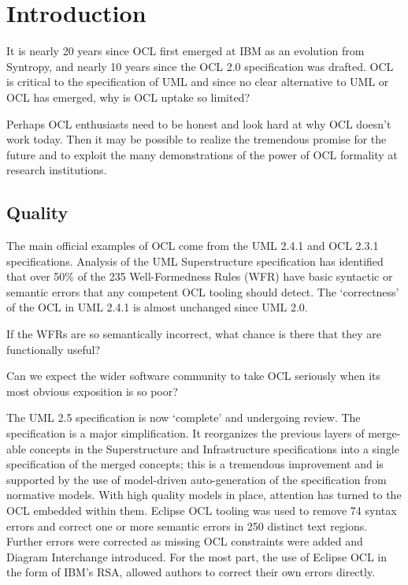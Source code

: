 \documentclass{acm_proc_article-sp}
\begin{document}



\section{Introduction}
It is nearly 20 years since OCL first emerged at IBM as an evolution from Syntropy, and nearly 10 years since the OCL 2.0 specification was drafted\cite{OCL-2.0-draft}. OCL is critical to the specification of UML and since no clear alternative to UML or OCL has emerged, why is OCL uptake so limited?

Perhaps OCL enthusiasts need to be honest and look hard at why OCL doesn't work today.
Then it may be possible to realize the tremendous promise for the future and to exploit the many
demonstrations of the power of OCL formality at research institutions.

\subsection{Quality}

The main official examples of OCL come from the UML 2.4.1\cite{UML-2.4.1-Super} and OCL 2.3.1\cite{OCL-2.3.1} specifications. Analysis\cite{UML-inconsistent} of the UML Superstructure specification has identified that over 50\% of the 235 Well-Formedness Rules (WFR) have basic syntactic or semantic errors
that any competent OCL tooling should detect. The `correctness' of the OCL in UML 2.4.1 is almost unchanged
since UML 2.0.

If the WFRs are so semantically incorrect, what chance is there that they are functionally useful?

Can we expect the wider software community to take OCL seriously when its most obvious exposition is so poor?

The UML 2.5 specification is now `complete' and undergoing review. The specification is a major simplification. It
reorganizes the previous layers of merge-able concepts in the Superstructure and Infrastructure specifications into
a single specification of the merged concepts; this is a tremendous improvement and is supported by the use of
model-driven auto-generation of the specification from normative models. With high quality models in place, attention has
turned to the OCL embedded within them. Eclipse OCL\cite{MDT/OCL} tooling was used to remove 74 syntax errors and correct one or more semantic errors in 250 distinct text regions. Further errors were corrected as missing OCL constraints were added and Diagram Interchange introduced.
For the most part, the use of Eclipse OCL in the form of IBM's RSA, allowed authors to correct their own errors directly.
\end{document}
